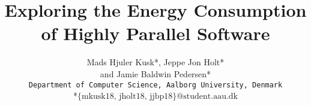 


\newpage
\title{\huge Exploring the Energy Consumption of Highly Parallel  Software}
\author{
Mads Hjuler Kusk*, Jeppe Jon Holt*\\ and Jamie Baldwin Pedersen*\\
\texttt{Department of Computer Science, Aalborg University, Denmark}\\
*\texttt{$\text{\{mkusk18, jholt18, jjbp18\}@student.aau.dk}$}
}
\newpage
\maketitle
\setcounter{page}{1}

\newpage
\begin{multicols}{2}[\printbibheading]
\printbibliography[heading=none]
\end{multicols}

